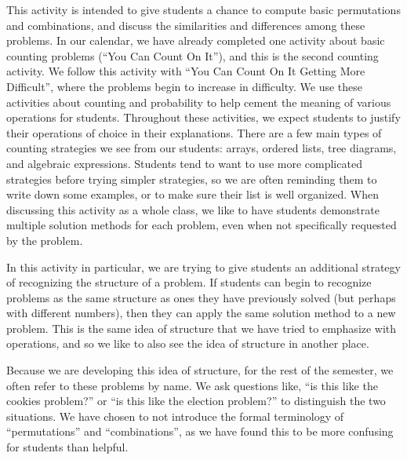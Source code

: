 \documentclass{ximera}
\begin{document}
\newpage
\begin{instructorNotes}
This activity is intended to give students a chance to compute basic permutations and combinations, and discuss the similarities and differences among these problems.  In our calendar, we have already completed one activity about basic counting problems (``You Can Count On It''), and this is the second counting activity.  We follow this activity with ``You Can Count On It Getting More Difficult'', where the problems begin to increase in difficulty.  We use these activities about counting and probability to help cement the meaning of various operations for students.  Throughout these activities, we expect students to justify their operations of choice in their explanations.  There are a few main types of counting strategies we see from our students: arrays, ordered lists, tree diagrams, and algebraic expressions.  Students tend to want to use more complicated strategies before trying simpler strategies, so we are often reminding them to write down some examples, or to make sure their list is well organized. When discussing this activity as a whole class, we like to have students demonstrate multiple solution methods for each problem, even when not specifically requested by the problem.  

In this activity in particular, we are trying to give students an additional strategy of recognizing the structure of a problem.  If students can begin to recognize problems as the same structure as ones they have previously solved (but perhaps with different numbers), then they can apply the same solution method to a new problem.  This is the same idea of structure that we have tried to emphasize with operations, and so we like to also see the idea of structure in another place.

Because we are developing this idea of structure, for the rest of the semester, we often refer to these problems by name.  We ask questions like, ``is this like the cookies problem?'' or ``is this like the election problem?'' to distinguish the two situations.  We have chosen to not  introduce the formal terminology of ``permutations'' and ``combinations'', as we have found this to be more confusing for students than helpful.  

\end{instructorNotes}
\end{document}
